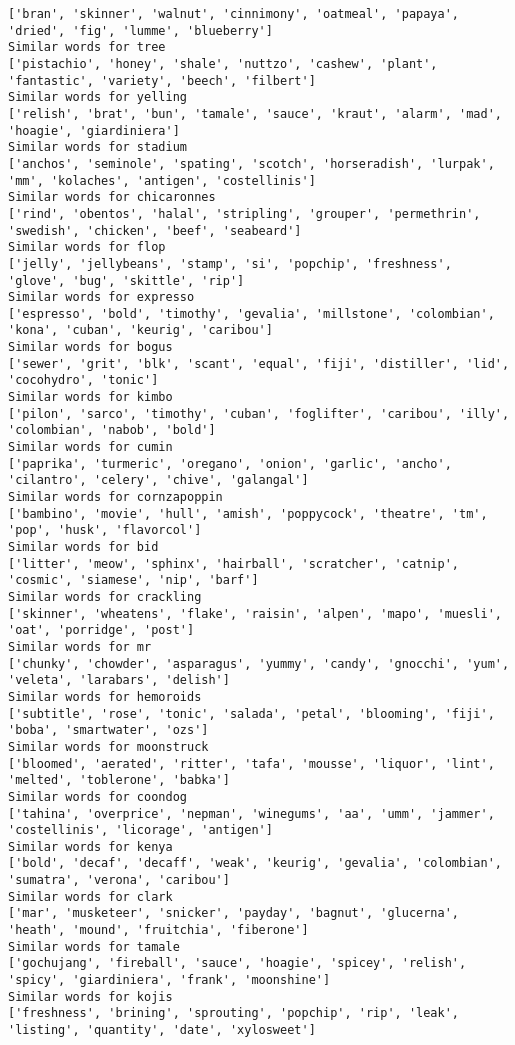 \documentclass[11pt]{article}
\begin{document}
\begin{Verbatim}[commandchars=\\\{\}]
['bran', 'skinner', 'walnut', 'cinnimony', 'oatmeal', 'papaya', 'dried', 'fig', 'lumme', 'blueberry']
Similar words for tree
['pistachio', 'honey', 'shale', 'nuttzo', 'cashew', 'plant', 'fantastic', 'variety', 'beech', 'filbert']
Similar words for yelling
['relish', 'brat', 'bun', 'tamale', 'sauce', 'kraut', 'alarm', 'mad', 'hoagie', 'giardiniera']
Similar words for stadium
['anchos', 'seminole', 'spating', 'scotch', 'horseradish', 'lurpak', 'mm', 'kolaches', 'antigen', 'costellinis']
Similar words for chicaronnes
['rind', 'obentos', 'halal', 'stripling', 'grouper', 'permethrin', 'swedish', 'chicken', 'beef', 'seabeard']
Similar words for flop
['jelly', 'jellybeans', 'stamp', 'si', 'popchip', 'freshness', 'glove', 'bug', 'skittle', 'rip']
Similar words for expresso
['espresso', 'bold', 'timothy', 'gevalia', 'millstone', 'colombian', 'kona', 'cuban', 'keurig', 'caribou']
Similar words for bogus
['sewer', 'grit', 'blk', 'scant', 'equal', 'fiji', 'distiller', 'lid', 'cocohydro', 'tonic']
Similar words for kimbo
['pilon', 'sarco', 'timothy', 'cuban', 'foglifter', 'caribou', 'illy', 'colombian', 'nabob', 'bold']
Similar words for cumin
['paprika', 'turmeric', 'oregano', 'onion', 'garlic', 'ancho', 'cilantro', 'celery', 'chive', 'galangal']
Similar words for cornzapoppin
['bambino', 'movie', 'hull', 'amish', 'poppycock', 'theatre', 'tm', 'pop', 'husk', 'flavorcol']
Similar words for bid
['litter', 'meow', 'sphinx', 'hairball', 'scratcher', 'catnip', 'cosmic', 'siamese', 'nip', 'barf']
Similar words for crackling
['skinner', 'wheatens', 'flake', 'raisin', 'alpen', 'mapo', 'muesli', 'oat', 'porridge', 'post']
Similar words for mr
['chunky', 'chowder', 'asparagus', 'yummy', 'candy', 'gnocchi', 'yum', 'veleta', 'larabars', 'delish']
Similar words for hemoroids
['subtitle', 'rose', 'tonic', 'salada', 'petal', 'blooming', 'fiji', 'boba', 'smartwater', 'ozs']
Similar words for moonstruck
['bloomed', 'aerated', 'ritter', 'tafa', 'mousse', 'liquor', 'lint', 'melted', 'toblerone', 'babka']
Similar words for coondog
['tahina', 'overprice', 'nepman', 'winegums', 'aa', 'umm', 'jammer', 'costellinis', 'licorage', 'antigen']
Similar words for kenya
['bold', 'decaf', 'decaff', 'weak', 'keurig', 'gevalia', 'colombian', 'sumatra', 'verona', 'caribou']
Similar words for clark
['mar', 'musketeer', 'snicker', 'payday', 'bagnut', 'glucerna', 'heath', 'mound', 'fruitchia', 'fiberone']
Similar words for tamale
['gochujang', 'fireball', 'sauce', 'hoagie', 'spicey', 'relish', 'spicy', 'giardiniera', 'frank', 'moonshine']
Similar words for kojis
['freshness', 'brining', 'sprouting', 'popchip', 'rip', 'leak', 'listing', 'quantity', 'date', 'xylosweet']

\end{Verbatim}
\end{document}
